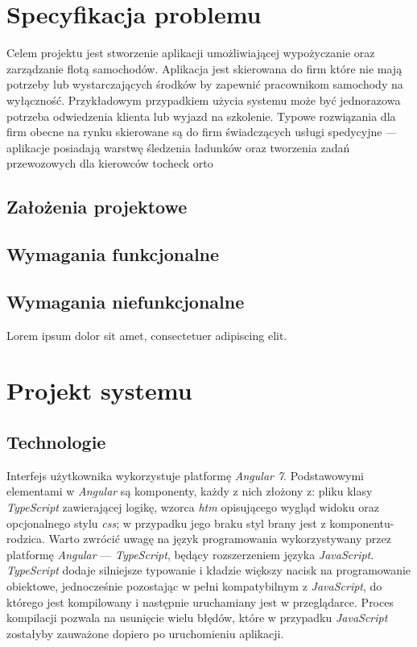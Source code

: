 \documentclass[eng,printmode,openany]{mgr}
\begin{document}
\chapter{Specyfikacja problemu}
Celem projektu jest stworzenie aplikacji umożliwiającej wypożyczanie oraz zarządzanie flotą samochodów. Aplikacja jest skierowana do firm które nie mają potrzeby lub wystarczających środków by zapewnić pracownikom samochody na wyłączność. Przykładowym przypadkiem użycia systemu może być jednorazowa potrzeba odwiedzenia klienta lub wyjazd na szkolenie. Typowe rozwiązania dla firm obecne na rynku skierowane są do firm świadczących usługi spedycyjne — aplikacje posiadają warstwę śledzenia ładunków oraz tworzenia zadań przewozowych dla kierowców tocheck orto
\section{Założenia projektowe}
\section{Wymagania funkcjonalne}
\section{Wymagania niefunkcjonalne}

Lorem ipsum dolor sit amet, consectetuer adipiscing elit.

\chapter{Projekt systemu}
\section{Technologie}
Interfejs użytkownika wykorzystuje platformę \textit{Angular 7}. Podstawowymi elementami w \textit{Angular} są komponenty, każdy z nich złożony z: pliku klasy \textit{TypeScript} zawierającej logikę, wzorca \textit{htm} opisującego wygląd widoku oraz opcjonalnego stylu \textit{css}; w przypadku jego braku styl brany jest z komponentu-rodzica. Warto zwrócić uwagę na język programowania wykorzystywany przez platformę \textit{Angular} — \textit{TypeScript}, będący rozszerzeniem języka \textit{JavaScript}. \textit{TypeScript} dodaje silniejsze typowanie i kładzie większy nacisk na programowanie obiektowe, jednocześnie pozostając w pełni kompatybilnym z \textit{JavaScript}, do którego jest kompilowany i  następnie uruchamiany jest w przeglądarce. Proces kompilacji pozwala na usunięcie wielu błędów, które w przypadku \textit{JavaScript} zostałyby zauważone dopiero po uruchomieniu aplikacji.
\end{document}
